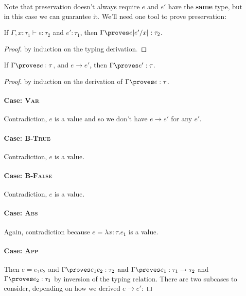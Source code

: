 \documentclass[10pt]{article}
\begin{document}
Note that preservation doesn't always require $e$ and $e'$ have the \textbf{same} type, but in this case we can guarantee it.
We'll need one tool to prove preservation:

\begin{lemma}
    If $\Gamma, x : \tau_1 \vdash e : \tau_2$ and $e' : \tau_1$, then $\Gamma \proves e[e'/x] : \tau_2$.
\end{lemma}
\begin{proof} by induction on the typing derivation.
\end{proof}

\begin{theorem}[Preservation]
    If $\Gamma \proves e : \tau$, and $e \to e'$, then $\Gamma \proves e' : \tau$.
\end{theorem}
\begin{proof} by induction on the derivation of $\Gamma \proves e : \tau$.

    \paragraph{Case: \textsc{Var}} Contradiction, $e$ is a value and so we don't have $e \to e'$ for any $e'$.

    \paragraph{Case: \textsc{B-True}} Contradiction, $e$ is a value.
    \paragraph{Case: \textsc{B-False}} Contradiction, $e$ is a value.

    \paragraph{Case: \textsc{Abs}} Again, contradiction because $e = \lambda x : \tau. e_1$ is a value.

    \paragraph{Case: \textsc{App}}

    Then $e = e_1 e_2$ and $\Gamma \proves e_1 e_2 : \tau_2$ and $\Gamma \proves e_1 : \tau_1 \to \tau_2$ and $\Gamma \proves e_2 : \tau_1$ by inversion of the typing relation.
    There are two subcases to consider, depending on how we derived $e \to e'$:


\end{proof}
\end{document}
